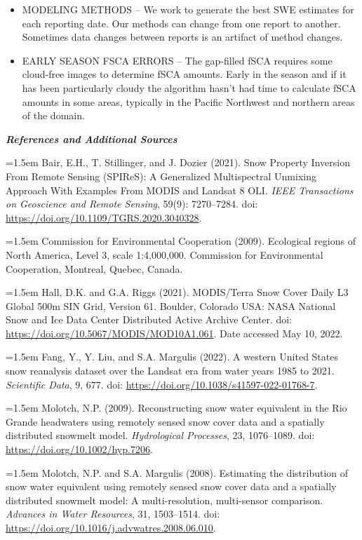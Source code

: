 \documentclass{article}
\begin{document}
\begin{itemize}
    \item MODELING METHODS – We work to generate the best SWE estimates for each reporting date. Our methods can change from one report to another. Sometimes data changes between reports is an artifact of method changes.
    \item EARLY SEASON FSCA ERRORS – The gap-filled fSCA requires some cloud-free images to determine fSCA amounts. Early in the season and if it has been particularly cloudy the algorithm hasn’t had time to calculate fSCA amounts in some areas, typically in the Pacific Northwest and northern areas of the domain.
\end{itemize}

\newpage
\fontsize{12}{16}
\noindent\textbf{\textit{References and Additional Sources}}\\
\fontsize{10}{14}

\noindent
\hangindent=1.5em
Bair, E.H., T. Stillinger, and J. Dozier (2021). Snow Property Inversion From Remote Sensing (SPIReS): A Generalized Multispectral Unmixing Approach With Examples From MODIS and Landsat 8 OLI. \textit{IEEE Transactions on Geoscience and Remote Sensing}, 59(9): 7270–7284. doi: \url{https://doi.org/10.1109/TGRS.2020.3040328}.

\noindent
\hangindent=1.5em
Commission for Environmental Cooperation (2009). Ecological regions of North America, Level 3, scale 1:4,000,000. Commission for Environmental Cooperation, Montreal, Quebec, Canada.

\noindent
\hangindent=1.5em
Hall, D.K. and G.A. Riggs (2021). MODIS/Terra Snow Cover Daily L3 Global 500m SIN Grid, Version 61. Boulder, Colorado USA: NASA National Snow and Ice Data Center Distributed Active Archive Center. doi: \url{https://doi.org/10.5067/MODIS/MOD10A1.061}. Date accessed May 10, 2022.

\noindent
\hangindent=1.5em
Fang, Y., Y. Liu, and S.A. Margulis (2022). A western United States snow reanalysis dataset over the Landsat era from water years 1985 to 2021. \textit{Scientific Data}, 9, 677. doi: \url{https://doi.org/10.1038/s41597-022-01768-7}.

\noindent
\hangindent=1.5em
Molotch, N.P. (2009). Reconstructing snow water equivalent in the Rio Grande headwaters using remotely sensed snow cover data and a spatially distributed snowmelt model. \textit{Hydrological Processes}, 23, 1076–1089. doi: \url{https://doi.org/10.1002/hyp.7206}.

\noindent
\hangindent=1.5em
Molotch, N.P. and S.A. Margulis (2008). Estimating the distribution of snow water equivalent using remotely sensed snow cover data and a spatially distributed snowmelt model: A multi-resolution, multi-sensor comparison. \textit{Advances in Water Resources}, 31, 1503–1514. doi: \url{https://doi.org/10.1016/j.advwatres.2008.06.010}.
\end{document}

